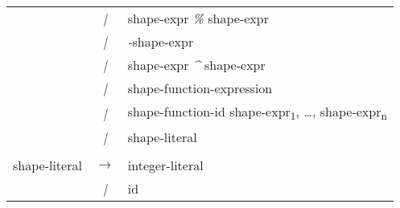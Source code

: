 \begin{tt}
{\begin{center}
\begin{longtable}{r c l}
& \emph{|} & shape-expr \emph{\%} shape-expr \\
& \emph{|} & \emph{-}shape-expr \\
& \emph{|} & shape-expr \emph{\^} shape-expr \\
& \emph{|} & shape-function-expression \\
& \emph{|} & shape-function-id shape-expr\textsubscript{1}, \ldots, shape-expr\textsubscript{n} \\
& \emph{|} & shape-literal \\
& & \\
shape-literal & $\rightarrow$ & integer-literal \\
& \emph{|} & id \\
\end{longtable}
\end{center}
}
\end{tt}


